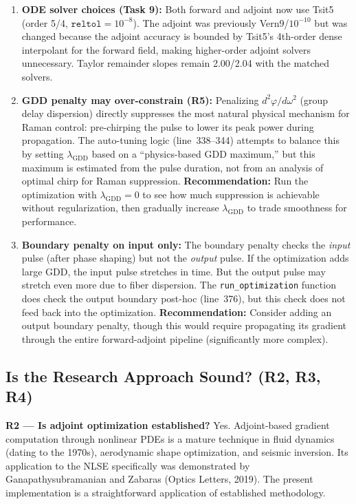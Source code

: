 \documentclass[12pt,a4paper]{article}
\theoremstyle{definition}
\begin{document}
\begin{enumerate}[leftmargin=*]
\item \textbf{ODE solver choices (Task 9):} Both forward and adjoint now use Tsit5 (order 5/4, $\texttt{reltol}=10^{-8}$). The adjoint was previously Vern9/$10^{-10}$ but was changed because the adjoint accuracy is bounded by Tsit5's 4th-order dense interpolant for the forward field, making higher-order adjoint solvers unnecessary. Taylor remainder slopes remain 2.00/2.04 with the matched solvers.

\item \textbf{GDD penalty may over-constrain (R5):} Penalizing $d^2\varphi/d\omega^2$ (group delay dispersion) directly suppresses the most natural physical mechanism for Raman control: pre-chirping the pulse to lower its peak power during propagation. The auto-tuning logic (line~338--344) attempts to balance this by setting $\lambda_{\text{GDD}}$ based on a ``physics-based GDD maximum,'' but this maximum is estimated from the pulse duration, not from an analysis of optimal chirp for Raman suppression. \textbf{Recommendation:} Run the optimization with $\lambda_{\text{GDD}} = 0$ to see how much suppression is achievable without regularization, then gradually increase $\lambda_{\text{GDD}}$ to trade smoothness for performance.

\item \textbf{Boundary penalty on input only:} The boundary penalty checks the \emph{input} pulse (after phase shaping) but not the \emph{output} pulse. If the optimization adds large GDD, the input pulse stretches in time. But the output pulse may stretch even more due to fiber dispersion. The \texttt{run\_optimization} function does check the output boundary post-hoc (line~376), but this check does not feed back into the optimization. \textbf{Recommendation:} Consider adding an output boundary penalty, though this would require propagating its gradient through the entire forward-adjoint pipeline (significantly more complex).
\end{enumerate}

\subsection{Is the Research Approach Sound? (R2, R3, R4)}

\textbf{R2 --- Is adjoint optimization established?} Yes. Adjoint-based gradient computation through nonlinear PDEs is a mature technique in fluid dynamics (dating to the 1970s), aerodynamic shape optimization, and seismic inversion. Its application to the NLSE specifically was demonstrated by Ganapathysubramanian and Zabaras (Optics Letters, 2019). The present implementation is a straightforward application of established methodology.
\end{document}
